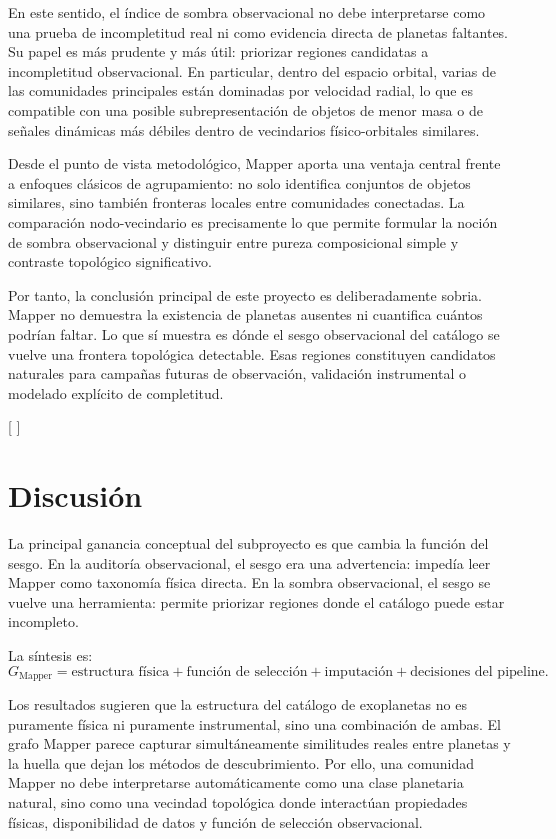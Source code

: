 \documentclass[11pt]{article}
\begin{document}
En este sentido, el índice de sombra observacional no debe interpretarse como una prueba de incompletitud real ni como evidencia directa de planetas faltantes. Su papel es más prudente y más útil: priorizar regiones candidatas a incompletitud observacional. En particular, dentro del espacio orbital, varias de las comunidades principales están dominadas por velocidad radial, lo que es compatible con una posible subrepresentación de objetos de menor masa o de señales dinámicas más débiles dentro de vecindarios físico-orbitales similares.

Desde el punto de vista metodológico, Mapper aporta una ventaja central frente a enfoques clásicos de agrupamiento: no solo identifica conjuntos de objetos similares, sino también fronteras locales entre comunidades conectadas. La comparación nodo-vecindario es precisamente lo que permite formular la noción de sombra observacional y distinguir entre pureza composicional simple y contraste topológico significativo.

Por tanto, la conclusión principal de este proyecto es deliberadamente sobria. Mapper no demuestra la existencia de planetas ausentes ni cuantifica cuántos podrían faltar. Lo que sí muestra es dónde el sesgo observacional del catálogo se vuelve una frontera topológica detectable. Esas regiones constituyen candidatos naturales para campañas futuras de observación, validación instrumental o modelado explícito de completitud.

[
]

\section{Discusión}

La principal ganancia conceptual del subproyecto es que cambia la función del sesgo. En la auditoría observacional, el sesgo era una advertencia: impedía leer Mapper como taxonomía física directa. En la sombra observacional, el sesgo se vuelve una herramienta: permite priorizar regiones donde el catálogo puede estar incompleto.

La síntesis es:
\[
G_{\mathrm{Mapper}} = \text{estructura física} + \text{función de selección} + \text{imputación} + \text{decisiones del pipeline}.
\]


Los resultados sugieren que la estructura del catálogo de exoplanetas no es puramente física ni puramente instrumental, sino una combinación de ambas. El grafo Mapper parece capturar simultáneamente similitudes reales entre planetas y la huella que dejan los métodos de descubrimiento. Por ello, una comunidad Mapper no debe interpretarse automáticamente como una clase planetaria natural, sino como una vecindad topológica donde interactúan propiedades físicas, disponibilidad de datos y función de selección observacional.
\end{document}
